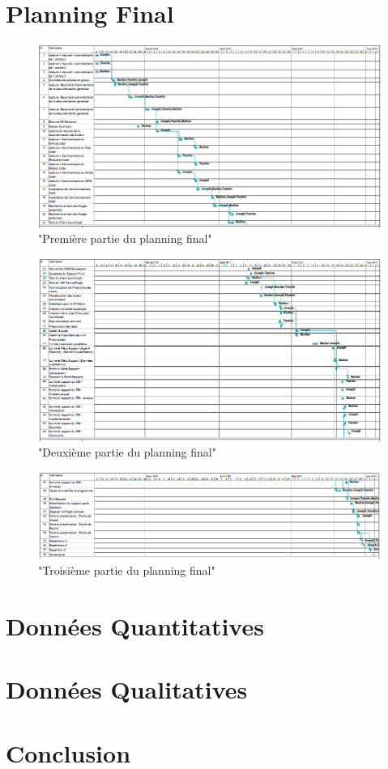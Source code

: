 \documentclass[12pt,a4paper]{report}
\begin{document}
\chapter{Planning Final}
\begin{figure}[!ht]
  	\hspace*{-2cm}   
	\includegraphics[scale=0.72]{"images/final_gantt_1"}
	\caption{"Première partie du planning final"}
\end{figure}

\begin{figure}[!ht]
  	\hspace*{-2cm}   
	\includegraphics[scale=0.75]{"images/final_gantt_2"}
	\caption{"Deuxième partie du planning final"}
\end{figure}

\begin{figure}[!ht]
  	\hspace*{-2cm}   
	\includegraphics[scale=0.7]{"images/final_gantt_3"}
	\caption{"Troisième partie du planning final"}
\end{figure}
\chapter{Données Quantitatives}	
\chapter{Données Qualitatives}
\chapter{Conclusion}
\end{document}
